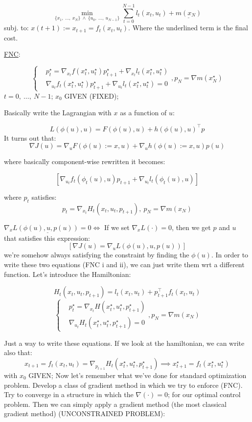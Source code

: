 \[ 
	\min_{\{x_1,\ \dots,\ x_N\}\ \land\ \{u_0,\ \dots,\ u_{N-1}\}}{\sum_{t=0}^{N-1}{l_t(x_t,u_t)} + \underline{m(x_N)}}
\]
subj. to: $x(t+1) := x_{t+1} = f_t(x_t,u_t)$. Where the underlined term is the final cost.

\underline{FNC}:

\[
	\left\{
	\begin{aligned}
	&p_t^\star = \nabla_{x_t}{f(x_t^\star,u_t^\star)}p_{t+1}^\star + \nabla_{x_t}{l_t(x_t^\star,u_t^\star)	}\\
	&\nabla_{u_t}{f_t(x_t^\star,u_t^\star)}p_{t+1}^\star + \nabla_{u_t}{l_t(x_t^\star,u_t^\star)} = 0
	\end{aligned}
	\right. , p_N = \nabla{m(x_N^\star)}
\]
$t=0,\ \dots,\ N-1$; $x_0$ GIVEN (FIXED);

Basically write the Lagrangian with $x$ as a function of $u$:

\[
	L(\phi(u), u) = F(\phi(u),u) + h(\phi(u),u)^\top p
\]
It turns out that:
\[
	\nabla{J(u)} = \nabla_u{F(\phi(u) := x,u)} + \nabla_u{h(\phi(u) := x,u)}p(u)
\]

where basically component-wise rewritten it becomes:

\[
	[\nabla_{u_t}{f_t(\phi_t(u),u)}p_{t+1} + \nabla_{u_t}{l_t(\phi_t(u),u)}]
\]

where $p_t$ satisfies:
\[
	p_t = \nabla_{x_t}{H_t(x_t,u_t,p_{t+1})},\ p_N = \nabla{m(x_N)}
\]

$\underline{\nabla_x{L(\phi(u),u,p(u))} = 0} \iff$ If we set $\nabla_x{L(\mathord{\cdot})} = 0$, then we get $p$ and $u$ that satisfies this expression:
\[	
	[\nabla{J(u)} = \nabla_u{L(\phi(u),u,p(u))}]
\]
we're somehow always satisfying the constraint by finding the $\phi(u)$. In order to write these two equations (FNC i and ii), we can just write them wrt a different function. Let's introduce the Hamiltonian:

\[
	H_t(x_t,u_t,p_{t+1}) = l_t(x_t,u_t) + p_{t+1}^\top f_t(x_t,u_t)
\]
\[
	\left\{
	\begin{aligned}
	&p_t^\star = \nabla_{x_t}{H(x_t^\star,u_t^\star,p_{t+1}^\star)}\\
	&\nabla_{u_t}{H_t(x_t^\star,u_t^\star,p_{t+1}^\star)} = 0
	\end{aligned}
	\right. , p_N = \nabla{m(x_N)}
\]

Just a way to write these equations. If we look at the hamiltonian, we can write also that:
\[
	x_{t+1} = f_t(x_t,u_t) = \nabla_{p_{t+1}}{H_t(x_t^\star,u_t^\star,p_{t+1}^\star)} \implies x_{t+1}^\star = f_t(x_t^\star,u_t^\star)
\]
with $x_0$ GIVEN; Now let's remember what we've done for standard optimization problem. Develop a class of gradient method in which we try to enforce (FNC). Try to converge in a structure in which the $\nabla{(\mathord{\cdot})} = 0$; for our optimal control problem. Then we can simply apply a gradient method (the most classical gradient method) (UNCONSTRAINED PROBLEM):

